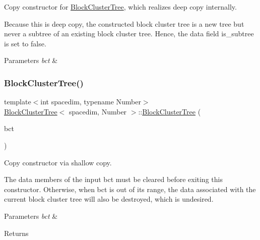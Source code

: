 Copy constructor for {\ttfamily \hyperlink{classBlockClusterTree}{Block\+Cluster\+Tree}}, which realizes deep copy internally.


\begin{DoxyDescription}
\item[Note ]Because this is deep copy, the constructed block cluster tree is a new tree but never a subtree of an existing block cluster tree. Hence, the data field {\ttfamily is\+\_\+subtree} is set to {\ttfamily false}. 
\end{DoxyDescription}


\begin{DoxyParams}{Parameters}
{\em bct} & \\
\hline
\end{DoxyParams}
\mbox{\label{classBlockClusterTree_ae3bb67cdcb7868237063c8003d4079ab}} 
\subsubsection{\texorpdfstring{Block\+Cluster\+Tree()}{BlockClusterTree()}\hspace{0.1cm}{\footnotesize\ttfamily [8/8]}}
{\footnotesize\ttfamily template$<$int spacedim, typename Number$>$ \\
\hyperlink{classBlockClusterTree}{Block\+Cluster\+Tree}$<$ spacedim, Number $>$\+::\hyperlink{classBlockClusterTree}{Block\+Cluster\+Tree} (\begin{DoxyParamCaption}\item[{\hyperlink{classBlockClusterTree}{Block\+Cluster\+Tree}$<$ spacedim, Number $>$ \&\&}]{bct }\end{DoxyParamCaption})}

Copy constructor via shallow copy.


\begin{DoxyDescription}
\item[Note ]The data members of the input {\ttfamily bct} must be cleared before exiting this constructor. Otherwise, when {\ttfamily bct} is out of its range, the data associated with the current block cluster tree will also be destroyed, which is undesired. 
\end{DoxyDescription}


\begin{DoxyParams}{Parameters}
{\em bct} & \\
\hline
\end{DoxyParams}
\begin{DoxyReturn}{Returns}

\end{DoxyReturn}
\mbox{\label{classBlockClusterTree_a43b969867200b06f3416647c3e4f9f61}} 
